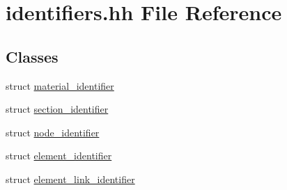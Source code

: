 \hypertarget{identifiers_8hh}{}\section{identifiers.\+hh File Reference}
\label{identifiers_8hh}
\subsection*{Classes}
\begin{DoxyCompactItemize}
\item 
struct \hyperlink{structmaterial__identifier}{material\+\_\+identifier}
\item 
struct \hyperlink{structsection__identifier}{section\+\_\+identifier}
\item 
struct \hyperlink{structnode__identifier}{node\+\_\+identifier}
\item 
struct \hyperlink{structelement__identifier}{element\+\_\+identifier}
\item 
struct \hyperlink{structelement__link__identifier}{element\+\_\+link\+\_\+identifier}
\end{DoxyCompactItemize}
